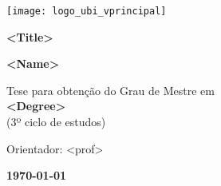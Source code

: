 \begin{titlepage}
\begin{center}

\begin{flushright}
\texttt{[image: logo\_ubi\_vprincipal]}\\


\vspace{7.6cm}

\rostotitulo \textbf{<Title>} \\

\vspace{1.8cm}

\rostonomes \textbf{<Name>}\\

\vspace{1.4cm}

\rostooutros Tese para obtenção do Grau de Mestre em\\
\rostonomes \textbf{<Degree>}\\
\rostooutros (3º ciclo de estudos)\\

\vspace{3.3cm}

\rostooutros Orientador: <prof>\\

\vspace{1.4cm}

\rostooutros \textbf{\today}

\end{flushright}

\end{center}
\end{titlepage}

